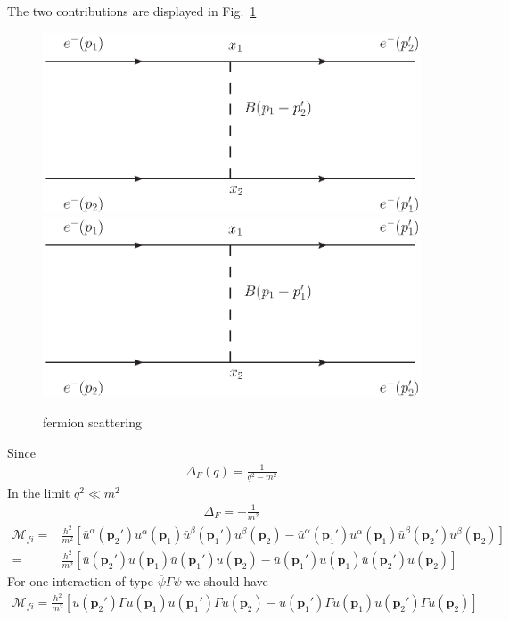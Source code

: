 The two contributions are displayed in Fig.~\ref{fig:sct}
\begin{figure} %
  \centering %
\includegraphics{scattering} %
 \includegraphics{scattering2} %
  \caption{fermion scattering} %
  \label{fig:sct} %
\end{figure} %
Since
\begin{align}
  \Delta_F(q)=\frac{1}{q^2-m^2}
\end{align}
In the limit $q^2\ll m^2$
\begin{align}
  \Delta_F=-\frac{1}{m^2}
\end{align}
\begin{align}
  \mathcal{M}_{fi}=&\frac{h^2}{m^2}\left[
\bar{u}^\alpha(\mathbf{p}_2')u^\alpha(\mathbf{p}_1)\bar{u}^\beta(\mathbf{p}_1')u^\beta(\mathbf{p}_2)
-\bar{u}^\alpha(\mathbf{p}_1')u^\alpha(\mathbf{p}_1)\bar{u}^\beta(\mathbf{p}_2')u^\beta(\mathbf{p}_2)
\right]\nonumber\\
=&\frac{h^2}{m^2}\left[
\bar{u}(\mathbf{p}_2')u(\mathbf{p}_1)\bar{u}(\mathbf{p}_1')u(\mathbf{p}_2)
-\bar{u}(\mathbf{p}_1')u(\mathbf{p}_1)\bar{u}(\mathbf{p}_2')u(\mathbf{p}_2)
\right]
\end{align}
For one interaction of type $\overline{\psi}\Gamma\psi$ we should have
\begin{align}
  \mathcal{M}_{fi}=\frac{h^2}{m^2}\left[
\bar{u}(\mathbf{p}_2')\Gamma u(\mathbf{p}_1)\bar{u}(\mathbf{p}_1')\Gamma u(\mathbf{p}_2)
-\bar{u}(\mathbf{p}_1')\Gamma u(\mathbf{p}_1)\bar{u}(\mathbf{p}_2')\Gamma u(\mathbf{p}_2)
\right]
\end{align}

